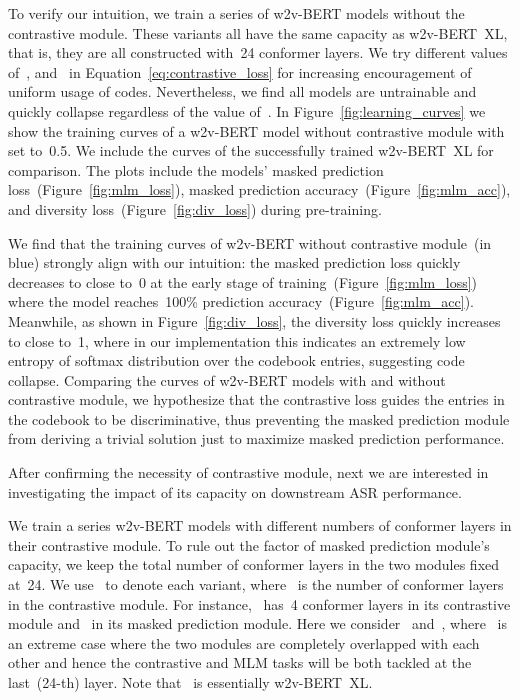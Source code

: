 \documentclass{article}
\begin{document}
To verify our intuition, we train a series of w2v-BERT models without the contrastive module.
These variants all have the same capacity as w2v-BERT~XL, that is, they are all constructed with~24 conformer layers.
We try different values of~, and~ in Equation~\ref{eq:contrastive_loss} for increasing encouragement of uniform usage of codes.
Nevertheless, we find all models are untrainable and quickly collapse regardless of the value of~.
In Figure~\ref{fig:learning_curves} we show the training curves of a w2v-BERT model without contrastive module with~ set to~0.5.
We include the curves of the successfully trained w2v-BERT~XL for comparison.
The plots include the models' masked prediction loss~(Figure~\ref{fig:mlm_loss}), masked prediction accuracy~(Figure~\ref{fig:mlm_acc}), and diversity loss~(Figure~\ref{fig:div_loss}) during pre-training.

We find that the training curves of w2v-BERT without contrastive module~(in blue) strongly align with our intuition: the masked prediction loss quickly decreases to close to~0 at the early stage of training~(Figure~\ref{fig:mlm_loss}) where the model reaches~100\% prediction accuracy~(Figure~\ref{fig:mlm_acc}).
Meanwhile, as shown in Figure~\ref{fig:div_loss}, the diversity loss quickly increases to close to~1, where in our implementation this indicates an extremely low entropy of softmax distribution over the codebook entries, suggesting code collapse.
Comparing the curves of w2v-BERT models with and without contrastive module, we hypothesize that the contrastive loss guides the entries in the codebook to be discriminative, thus preventing the masked prediction module from deriving a trivial solution just to maximize masked prediction performance.

After confirming the necessity of contrastive module, next we are interested in investigating the impact of its capacity on downstream ASR performance.

We train a series w2v-BERT models with different numbers of conformer layers in their contrastive module.
To rule out the factor of masked prediction module's capacity, we keep the total number of conformer layers in the two modules fixed at~24.
We use~ to denote each variant, where~ is the number of conformer layers in the contrastive module.
For instance,~ has~4 conformer layers in its contrastive module and~ in its masked prediction module.
Here we consider~ and~, where~ is an extreme case where the two modules are completely overlapped with each other and hence the contrastive and MLM tasks will be both tackled at the last~(24-th) layer.
Note that~ is essentially w2v-BERT~XL.
\end{document}
